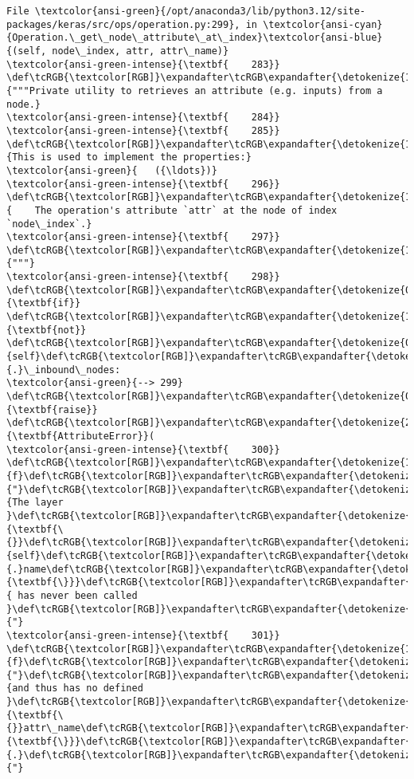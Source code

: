 \documentclass[11pt]{article}
\begin{document}
\begin{Verbatim}[commandchars=\\\{\}, frame=single, framerule=2mm, rulecolor=\color{outerrorbackground}]
File \textcolor{ansi-green}{/opt/anaconda3/lib/python3.12/site-packages/keras/src/ops/operation.py:299}, in \textcolor{ansi-cyan}{Operation.\_get\_node\_attribute\_at\_index}\textcolor{ansi-blue}{(self, node\_index, attr, attr\_name)}
\textcolor{ansi-green-intense}{\textbf{    283}} \def\tcRGB{\textcolor[RGB]}\expandafter\tcRGB\expandafter{\detokenize{175,0,0}}{"""Private utility to retrieves an attribute (e.g. inputs) from a node.}
\textcolor{ansi-green-intense}{\textbf{    284}} 
\textcolor{ansi-green-intense}{\textbf{    285}} \def\tcRGB{\textcolor[RGB]}\expandafter\tcRGB\expandafter{\detokenize{175,0,0}}{This is used to implement the properties:}
\textcolor{ansi-green}{   ({\ldots})}
\textcolor{ansi-green-intense}{\textbf{    296}} \def\tcRGB{\textcolor[RGB]}\expandafter\tcRGB\expandafter{\detokenize{175,0,0}}{    The operation's attribute `attr` at the node of index `node\_index`.}
\textcolor{ansi-green-intense}{\textbf{    297}} \def\tcRGB{\textcolor[RGB]}\expandafter\tcRGB\expandafter{\detokenize{175,0,0}}{"""}
\textcolor{ansi-green-intense}{\textbf{    298}} \def\tcRGB{\textcolor[RGB]}\expandafter\tcRGB\expandafter{\detokenize{0,135,0}}{\textbf{if}} \def\tcRGB{\textcolor[RGB]}\expandafter\tcRGB\expandafter{\detokenize{175,0,255}}{\textbf{not}} \def\tcRGB{\textcolor[RGB]}\expandafter\tcRGB\expandafter{\detokenize{0,135,0}}{self}\def\tcRGB{\textcolor[RGB]}\expandafter\tcRGB\expandafter{\detokenize{98,98,98}}{.}\_inbound\_nodes:
\textcolor{ansi-green}{--> 299}     \def\tcRGB{\textcolor[RGB]}\expandafter\tcRGB\expandafter{\detokenize{0,135,0}}{\textbf{raise}} \def\tcRGB{\textcolor[RGB]}\expandafter\tcRGB\expandafter{\detokenize{215,95,95}}{\textbf{AttributeError}}(
\textcolor{ansi-green-intense}{\textbf{    300}}         \def\tcRGB{\textcolor[RGB]}\expandafter\tcRGB\expandafter{\detokenize{175,0,0}}{f}\def\tcRGB{\textcolor[RGB]}\expandafter\tcRGB\expandafter{\detokenize{175,0,0}}{"}\def\tcRGB{\textcolor[RGB]}\expandafter\tcRGB\expandafter{\detokenize{175,0,0}}{The layer }\def\tcRGB{\textcolor[RGB]}\expandafter\tcRGB\expandafter{\detokenize{175,95,135}}{\textbf{\{}}\def\tcRGB{\textcolor[RGB]}\expandafter\tcRGB\expandafter{\detokenize{0,135,0}}{self}\def\tcRGB{\textcolor[RGB]}\expandafter\tcRGB\expandafter{\detokenize{98,98,98}}{.}name\def\tcRGB{\textcolor[RGB]}\expandafter\tcRGB\expandafter{\detokenize{175,95,135}}{\textbf{\}}}\def\tcRGB{\textcolor[RGB]}\expandafter\tcRGB\expandafter{\detokenize{175,0,0}}{ has never been called }\def\tcRGB{\textcolor[RGB]}\expandafter\tcRGB\expandafter{\detokenize{175,0,0}}{"}
\textcolor{ansi-green-intense}{\textbf{    301}}         \def\tcRGB{\textcolor[RGB]}\expandafter\tcRGB\expandafter{\detokenize{175,0,0}}{f}\def\tcRGB{\textcolor[RGB]}\expandafter\tcRGB\expandafter{\detokenize{175,0,0}}{"}\def\tcRGB{\textcolor[RGB]}\expandafter\tcRGB\expandafter{\detokenize{175,0,0}}{and thus has no defined }\def\tcRGB{\textcolor[RGB]}\expandafter\tcRGB\expandafter{\detokenize{175,95,135}}{\textbf{\{}}attr\_name\def\tcRGB{\textcolor[RGB]}\expandafter\tcRGB\expandafter{\detokenize{175,95,135}}{\textbf{\}}}\def\tcRGB{\textcolor[RGB]}\expandafter\tcRGB\expandafter{\detokenize{175,0,0}}{.}\def\tcRGB{\textcolor[RGB]}\expandafter\tcRGB\expandafter{\detokenize{175,0,0}}{"}

\end{Verbatim}
\end{document}
